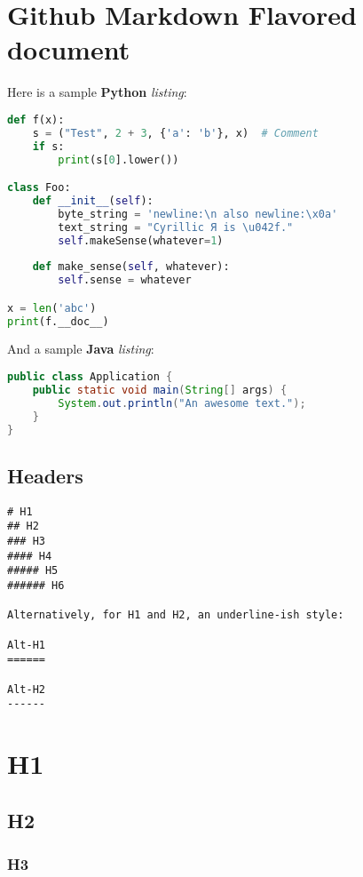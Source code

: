 \documentclass[a4paper, 11pt]{gfm}
\begin{document}
\section{Github Markdown Flavored document}

Here is a sample {\bf Python} {\it listing}:

\begin{lstlisting}[language=Python]
def f(x):
	s = ("Test", 2 + 3, {'a': 'b'}, x)  # Comment
	if s:
		print(s[0].lower())

class Foo:
	def __init__(self):
		byte_string = 'newline:\n also newline:\x0a'
		text_string = "Cyrillic Я is \u042f."
		self.makeSense(whatever=1)
	
	def make_sense(self, whatever):
		self.sense = whatever

x = len('abc')
print(f.__doc__)
\end{lstlisting}

And a sample {\bf Java} {\it listing}:

\begin{lstlisting}[language=Java]
public class Application {
    public static void main(String[] args) {
        System.out.println("An awesome text.");
    }
}
\end{lstlisting}

\subsection{Headers}

\begin{lstlisting}
# H1
## H2
### H3
#### H4
##### H5
###### H6

Alternatively, for H1 and H2, an underline-ish style:

Alt-H1
======

Alt-H2
------
\end{lstlisting}

\section{H1}

\subsection{H2}

\subsubsection{H3}
\end{document}
